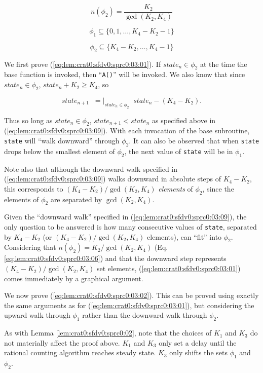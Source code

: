 \begin{vworklemmaproof}
\begin{equation}
\label{eq:lem:crat0:sfdv0:sprc0:03:06}
n(\phi_2) = \frac{K_2}{\gcd(K_2, K_4)}
\end{equation}

\begin{equation}
\label{eq:lem:crat0:sfdv0:sprc0:03:07}
\phi_1 \subseteq \{ 0, 1, \ldots , K_4 - K_2 - 1 \}
\end{equation}

\begin{equation}
\label{eq:lem:crat0:sfdv0:sprc0:03:08}
\phi_2 \subseteq \{K_4 - K_2, \ldots , K_4 - 1 \}
\end{equation}

We first prove (\ref{eq:lem:crat0:sfdv0:sprc0:03:01}).
If $state_n \in \phi_2$ at the time the base function
is invoked, then 
``\texttt{A()}'' will be invoked.  We also know that
since $state_n \in \phi_2$, $state_n + K_2 \geq K_4$, so

\begin{equation}
\label{eq:lem:crat0:sfdv0:sprc0:03:09}
state_{n+1} \;\; =|_{state_n \in \phi_2} \;\; state_n - (K_4 - K_2) .
\end{equation}

Thus so long as $state_n \in \phi_2$, $state_{n+1} < state_n$
as specified above in (\ref{eq:lem:crat0:sfdv0:sprc0:03:09}).
With each invocation of the base subroutine, \texttt{state} will
``walk downward'' through $\phi_2$.  It can
also be observed that when \texttt{state} drops below the smallest
element of $\phi_2$, the next value of \texttt{state} will
be in $\phi_1$.

Note also that although the downward walk specified in 
(\ref{eq:lem:crat0:sfdv0:sprc0:03:09}) walks downward in absolute steps
of $K_4-K_2$, this corresponds to $(K_4-K_2) / \gcd(K_2, K_4)$ 
\emph{elements} of $\phi_2$, since the elements of $\phi_2$ are
separated by $\gcd(K_2, K_4)$.

Given the ``downward walk'' specified in (\ref{eq:lem:crat0:sfdv0:sprc0:03:09}),
the only question to be answered is how many consecutive values of 
\texttt{state}, separated by $K_4-K_2$ (or $(K_4-K_2)/\gcd(K_2, K_4)$ elements),
 can ``fit'' into
$\phi_2$.  Considering that $n(\phi_2) = K_2/\gcd(K_2, K_4)$
(Eq. \ref{eq:lem:crat0:sfdv0:sprc0:03:06}) and that the
downward step represents $(K_4-K_2)/\gcd(K_2, K_4)$ set elements,
(\ref{eq:lem:crat0:sfdv0:sprc0:03:01}) comes immediately by
a graphical argument.

We now prove (\ref{eq:lem:crat0:sfdv0:sprc0:03:02}).  
This can be proved using exactly the same arguments
as for (\ref{eq:lem:crat0:sfdv0:sprc0:03:01}), but
considering the upward walk through $\phi_1$ rather
than the downward walk through $\phi_2$.

As with Lemma \ref{lem:crat0:sfdv0:sprc0:02},
note that the choices of $K_1$ and $K_3$ do not
materially affect the proof above.  $K_1$ and
$K_3$ only set a delay until the rational counting
algorithm reaches steady state.  $K_3$ only shifts
the sets $\phi_1$ and $\phi_2$.
\end{vworklemmaproof}
